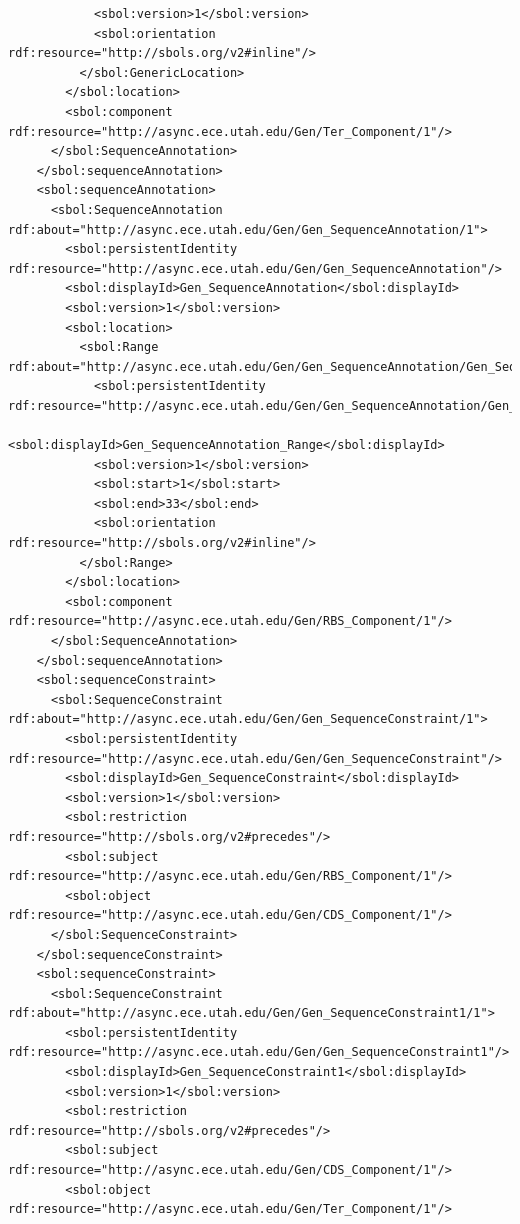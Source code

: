 \begin{lstlisting}
            <sbol:version>1</sbol:version>
            <sbol:orientation rdf:resource="http://sbols.org/v2#inline"/>
          </sbol:GenericLocation>
        </sbol:location>
        <sbol:component rdf:resource="http://async.ece.utah.edu/Gen/Ter_Component/1"/>
      </sbol:SequenceAnnotation>
    </sbol:sequenceAnnotation>
    <sbol:sequenceAnnotation>
      <sbol:SequenceAnnotation rdf:about="http://async.ece.utah.edu/Gen/Gen_SequenceAnnotation/1">
        <sbol:persistentIdentity rdf:resource="http://async.ece.utah.edu/Gen/Gen_SequenceAnnotation"/>
        <sbol:displayId>Gen_SequenceAnnotation</sbol:displayId>
        <sbol:version>1</sbol:version>
        <sbol:location>
          <sbol:Range rdf:about="http://async.ece.utah.edu/Gen/Gen_SequenceAnnotation/Gen_SequenceAnnotation_Range/1">
            <sbol:persistentIdentity rdf:resource="http://async.ece.utah.edu/Gen/Gen_SequenceAnnotation/Gen_SequenceAnnotation_Range"/>
            <sbol:displayId>Gen_SequenceAnnotation_Range</sbol:displayId>
            <sbol:version>1</sbol:version>
            <sbol:start>1</sbol:start>
            <sbol:end>33</sbol:end>
            <sbol:orientation rdf:resource="http://sbols.org/v2#inline"/>
          </sbol:Range>
        </sbol:location>
        <sbol:component rdf:resource="http://async.ece.utah.edu/Gen/RBS_Component/1"/>
      </sbol:SequenceAnnotation>
    </sbol:sequenceAnnotation>
    <sbol:sequenceConstraint>
      <sbol:SequenceConstraint rdf:about="http://async.ece.utah.edu/Gen/Gen_SequenceConstraint/1">
        <sbol:persistentIdentity rdf:resource="http://async.ece.utah.edu/Gen/Gen_SequenceConstraint"/>
        <sbol:displayId>Gen_SequenceConstraint</sbol:displayId>
        <sbol:version>1</sbol:version>
        <sbol:restriction rdf:resource="http://sbols.org/v2#precedes"/>
        <sbol:subject rdf:resource="http://async.ece.utah.edu/Gen/RBS_Component/1"/>
        <sbol:object rdf:resource="http://async.ece.utah.edu/Gen/CDS_Component/1"/>
      </sbol:SequenceConstraint>
    </sbol:sequenceConstraint>
    <sbol:sequenceConstraint>
      <sbol:SequenceConstraint rdf:about="http://async.ece.utah.edu/Gen/Gen_SequenceConstraint1/1">
        <sbol:persistentIdentity rdf:resource="http://async.ece.utah.edu/Gen/Gen_SequenceConstraint1"/>
        <sbol:displayId>Gen_SequenceConstraint1</sbol:displayId>
        <sbol:version>1</sbol:version>
        <sbol:restriction rdf:resource="http://sbols.org/v2#precedes"/>
        <sbol:subject rdf:resource="http://async.ece.utah.edu/Gen/CDS_Component/1"/>
        <sbol:object rdf:resource="http://async.ece.utah.edu/Gen/Ter_Component/1"/>

\end{lstlisting}

